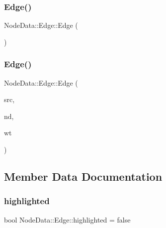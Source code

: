 \subsubsection{\texorpdfstring{Edge()}{Edge()}\hspace{0.1cm}{\footnotesize\ttfamily [1/2]}}
{\footnotesize\ttfamily Node\+Data\+::\+Edge\+::\+Edge (\begin{DoxyParamCaption}{ }\end{DoxyParamCaption})\hspace{0.3cm}{\ttfamily [inline]}}

\mbox{\label{struct_node_data_1_1_edge_a16e86dc9332ab41c3fbb0944448953cc}} 
\subsubsection{\texorpdfstring{Edge()}{Edge()}\hspace{0.1cm}{\footnotesize\ttfamily [2/2]}}
{\footnotesize\ttfamily Node\+Data\+::\+Edge\+::\+Edge (\begin{DoxyParamCaption}\item[{std\+::shared\+\_\+ptr$<$ \mbox{\hyperlink{class_node_data}{Node\+Data}} $>$}]{src,  }\item[{std\+::shared\+\_\+ptr$<$ \mbox{\hyperlink{class_node_data}{Node\+Data}} $>$}]{nd,  }\item[{double}]{wt }\end{DoxyParamCaption})\hspace{0.3cm}{\ttfamily [inline]}}



\subsection{Member Data Documentation}
\mbox{\label{struct_node_data_1_1_edge_a0c92519f4f3db36e2132257f9cc54fc0}} 
\subsubsection{\texorpdfstring{highlighted}{highlighted}}
{\footnotesize\ttfamily bool Node\+Data\+::\+Edge\+::highlighted = false}

